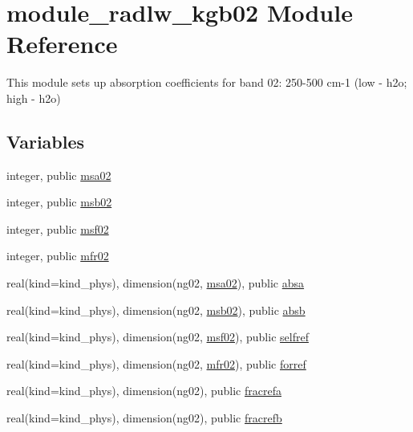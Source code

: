 \hypertarget{namespacemodule__radlw__kgb02}{}\section{module\+\_\+radlw\+\_\+kgb02 Module Reference}
\label{namespacemodule__radlw__kgb02}


This module sets up absorption coefficients for band 02\+: 250-\/500 cm-\/1 (low -\/ h2o; high -\/ h2o)  


\subsection*{Variables}
\begin{DoxyCompactItemize}
\item 
integer, public \hyperlink{namespacemodule__radlw__kgb02_a370b514d7834ac2a22d245f118882bf4}{msa02}
\item 
integer, public \hyperlink{namespacemodule__radlw__kgb02_a03e70b84fd16795104a3fb7b425af70c}{msb02}
\item 
integer, public \hyperlink{namespacemodule__radlw__kgb02_a99b728d38d664afc203303563541ab5c}{msf02}
\item 
integer, public \hyperlink{namespacemodule__radlw__kgb02_a2973c2e9220e85b74f0b251c896aa837}{mfr02}
\item 
real(kind=kind\+\_\+phys), dimension(ng02, \hyperlink{namespacemodule__radlw__kgb02_a370b514d7834ac2a22d245f118882bf4}{msa02}), public \hyperlink{namespacemodule__radlw__kgb02_a46db893d4456b2d867130bb208cb2206}{absa}
\item 
real(kind=kind\+\_\+phys), dimension(ng02, \hyperlink{namespacemodule__radlw__kgb02_a03e70b84fd16795104a3fb7b425af70c}{msb02}), public \hyperlink{namespacemodule__radlw__kgb02_acf34f9255586c9ed5ac5370db5b63c14}{absb}
\item 
real(kind=kind\+\_\+phys), dimension(ng02, \hyperlink{namespacemodule__radlw__kgb02_a99b728d38d664afc203303563541ab5c}{msf02}), public \hyperlink{namespacemodule__radlw__kgb02_addb071e93b4ff49ba1f1c4d102e275f1}{selfref}
\item 
real(kind=kind\+\_\+phys), dimension(ng02, \hyperlink{namespacemodule__radlw__kgb02_a2973c2e9220e85b74f0b251c896aa837}{mfr02}), public \hyperlink{namespacemodule__radlw__kgb02_af6f3d7a0ab6858eab9d4d3e2d2d68031}{forref}
\item 
real(kind=kind\+\_\+phys), dimension(ng02), public \hyperlink{namespacemodule__radlw__kgb02_af6db1580bd4a8b037cdd3e14765e2c83}{fracrefa}
\item 
real(kind=kind\+\_\+phys), dimension(ng02), public \hyperlink{namespacemodule__radlw__kgb02_aeedda30c8d2bd7c9e7124c6445c8c20e}{fracrefb}
\end{DoxyCompactItemize}


